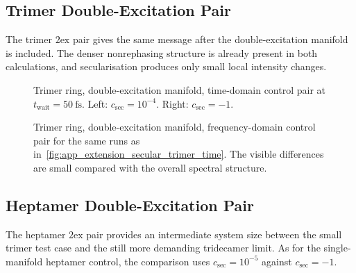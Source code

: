\subsection{Trimer Double-Excitation Pair}

The trimer \(2\mathrm{ex}\) pair gives the same message after the
double-excitation manifold is included. The denser nonrephasing structure is
already present in both calculations, and secularisation produces only small
local intensity changes.

\begin{figure}[htbp]
    \centering
    \begin{minipage}[t]{0.49\linewidth}
        \centering
        \safeplaceholdergraphic[1.18\linewidth]{\trimerSecTimePath}
    \end{minipage}\hfill
    \begin{minipage}[t]{0.49\linewidth}
        \centering
        \safeplaceholdergraphic[1.18\linewidth]{\trimerNonSecTimePath}
    \end{minipage}
    \caption{Trimer ring, double-excitation manifold, time-domain control pair
    at \(t_{\mathrm{wait}}=\SI{50}{\femto\second}\). Left:
    \(c_{\mathrm{sec}}=10^{-4}\). Right: \(c_{\mathrm{sec}}=-1\).}
    \label{fig:app_extension_secular_trimer_time}
\end{figure}

\begin{figure}[htbp]
    \centering
    \begin{minipage}[t]{0.49\linewidth}
        \centering
        \safeplaceholdergraphic[1.18\linewidth]{\trimerSecFreqPath}
    \end{minipage}\hfill
    \begin{minipage}[t]{0.49\linewidth}
        \centering
        \safeplaceholdergraphic[1.18\linewidth]{\trimerNonSecFreqPath}
    \end{minipage}
    \caption{Trimer ring, double-excitation manifold, frequency-domain control
    pair for the same runs as
    in~\autoref{fig:app_extension_secular_trimer_time}. The visible differences
    are small compared with the overall spectral structure.}
    \label{fig:app_extension_secular_trimer_freq}
\end{figure}

\subsection{Heptamer Double-Excitation Pair}

The heptamer \(2\mathrm{ex}\) pair provides an intermediate system size between
the small trimer test case and the still more demanding tridecamer limit. As
for the single-manifold heptamer control, the
comparison uses \(c_{\mathrm{sec}}=10^{-5}\) against
\(c_{\mathrm{sec}}=-1\).

